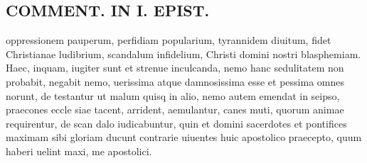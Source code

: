 \documentclass{article}
\begin{document}
\begin{pages}
\section*{COMMENT. IN I. EPIST. }
\marginpar{[ p.534 ]}\pstart oppressionem pauperum, perfidiam popularium, tyrannidem diuitum, fidet Christianae ludibrium, scandalum infidelium, Christi domini nostri blasphemiam. Haec, inquam, iugiter sunt et strenue inculcanda, nemo hanc sedulitatem non probabit, negabit nemo, uerissima atque damnosissima esse et pessima omnes norunt, de testantur ut malum quisq in alio, nemo autem emendat in seipso, praecones eccle siae tacent, arrident, aemulantur, canes muti, quorum animae requirentur, de scan dalo iudicabuntur, quin et domini sacerdotes et pontifices maximam sibi gloriam ducunt contrarie uiuentes huic apostolico praecepto, quum haberi uelint maxi, me apostolici.  \pend
{}
{}

\end{pages}
\end{document}
